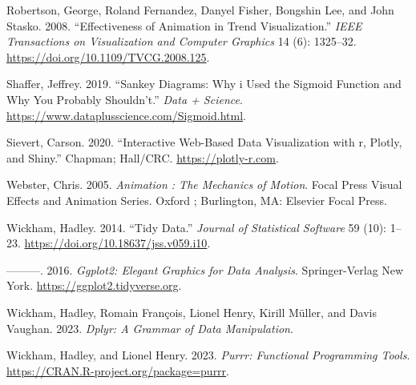 \begin{CSLReferences}{1}{0}
\leavevmode{}%
Robertson, George, Roland Fernandez, Danyel Fisher, Bongshin Lee, and John Stasko. 2008. {``Effectiveness of Animation in Trend Visualization.''} \emph{IEEE Transactions on Visualization and Computer Graphics} 14 (6): 1325--32. \url{https://doi.org/10.1109/TVCG.2008.125}.

\leavevmode{}%
Shaffer, Jeffrey. 2019. {``Sankey Diagrams: Why i Used the Sigmoid Function and Why You Probably Shouldn't.''} \emph{Data + Science}. \url{https://www.dataplusscience.com/Sigmoid.html}.

\leavevmode{}%
Sievert, Carson. 2020. {``Interactive {Web-Based} Data Visualization with r, Plotly, and Shiny.''} Chapman; Hall/CRC. \url{https://plotly-r.com}.

\leavevmode{}%
Webster, Chris. 2005. \emph{Animation : The Mechanics of Motion}. Focal Press Visual Effects and Animation Series. Oxford ; Burlington, MA: Elsevier Focal Press.

\leavevmode{}%
Wickham, Hadley. 2014. {``Tidy Data.''} \emph{Journal of Statistical Software} 59 (10): 1--23. \url{https://doi.org/10.18637/jss.v059.i10}.

\leavevmode{}%
---------. 2016. \emph{Ggplot2: Elegant Graphics for Data Analysis}. Springer-Verlag New York. \url{https://ggplot2.tidyverse.org}.

\leavevmode{}%
Wickham, Hadley, Romain François, Lionel Henry, Kirill Müller, and Davis Vaughan. 2023. \emph{Dplyr: A Grammar of Data Manipulation}.

\leavevmode{}%
Wickham, Hadley, and Lionel Henry. 2023. \emph{Purrr: Functional Programming Tools}. \url{https://CRAN.R-project.org/package=purrr}.

\end{CSLReferences}



\address{%
Krisanat Anukarnsakulchularp\\
Monash University\\%
Department of Econometrics and Business Statistics\\ Melbourne, Australia\\
%
%
\textit{ORCiD: \href{https://orcid.org/0009-0008-5638-7124}{0009-0008-5638-7124}}\\%
\href{mailto:kanu0003@student.monash.edu}{\nolinkurl{kanu0003@student.monash.edu}}%
}
